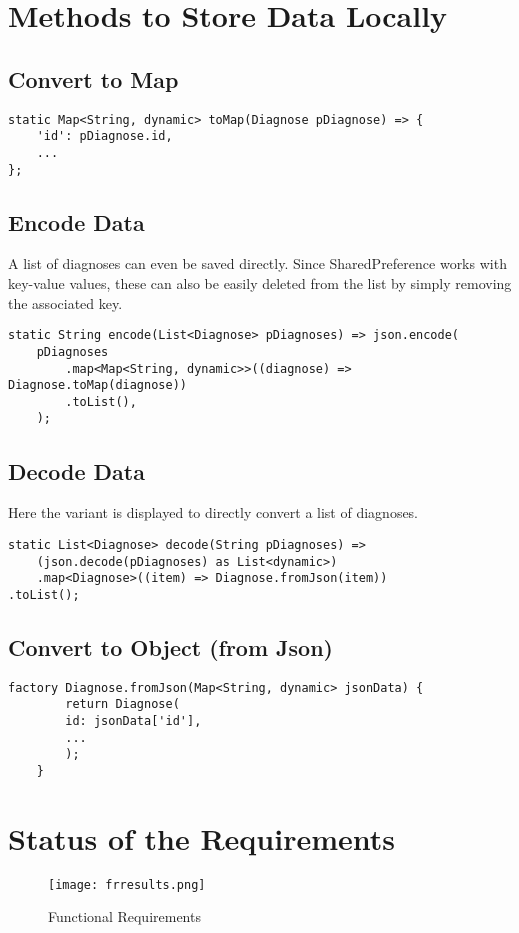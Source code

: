 \chapter{Methods to Store Data Locally}
\section{Convert to Map}
\begin{lstlisting}[caption=Data toMap]
  static Map<String, dynamic> toMap(Diagnose pDiagnose) => {
	'id': pDiagnose.id,
	...
};
\end{lstlisting}
\section{Encode Data}
A list of diagnoses can even be saved directly. Since SharedPreference works with key-value values, these can also be easily deleted from the list by simply removing the associated key.
\begin{lstlisting}[caption=Encode Data]
  static String encode(List<Diagnose> pDiagnoses) => json.encode(
	pDiagnoses
		.map<Map<String, dynamic>>((diagnose) => Diagnose.toMap(diagnose))
		.toList(),
	);
\end{lstlisting}
\section{Decode Data}
Here the variant is displayed to directly convert a list of diagnoses.
\begin{lstlisting}[caption=Decode Data]
static List<Diagnose> decode(String pDiagnoses) =>
	(json.decode(pDiagnoses) as List<dynamic>)
	.map<Diagnose>((item) => Diagnose.fromJson(item))
.toList();
\end{lstlisting}
\section{Convert to Object (from Json)}
\begin{lstlisting}[caption=Data fromJson]
	factory Diagnose.fromJson(Map<String, dynamic> jsonData) {
		return Diagnose(
		id: jsonData['id'],
		...
		);
	}
\end{lstlisting}

\chapter{Status of the Requirements}
\begin{figure}[H]
	\centering
	\texttt{[image: frresults.png]}
	\caption{Functional Requirements}
\end{figure}


\clearpage
\normalsize
{}

\begingroup
\pagestyle{plain}
\listoffigures
\listoftables
\endgroup







